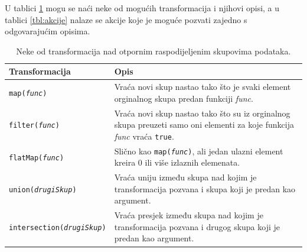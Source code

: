 \documentclass[times, utf8, zavrsni, numeric]{fer}
\begin{document}
U tablici \ref{tbl:transformacije} mogu se naći neke od mogućih transformacija i njihovi opisi, a u tablici \ref{tbl:akcije} nalaze se akcije koje je moguće pozvati zajedno s odgovarajućim opisima.
\begin{table}[htb]
\caption{Neke od transformacija nad otpornim raspodijeljenim skupovima podataka.}
\label{tbl:transformacije}
\centering
\begin{tabular}{lp{8cm}} 
\hline
Transformacija & Opis\\
\hline
\texttt{map(\emph{func})} & Vraća novi skup nastao tako što je svaki element orginalnog  skupa predan funkciji \emph{func}. \\
\texttt{filter(\emph{func})} & Vraća novi skup nastao tako što su iz orginalnog skupa preuzeti samo oni elementi za koje funkcija \emph{func} vraća \texttt{true}. \\
\texttt{flatMap(\emph{func})} & Slično kao \texttt{map(\emph{func})}, ali jedan ulazni element kreira 0 ili više izlaznih elemenata. \\
\texttt{union(\emph{drugiSkup})} & Vraća uniju između skupa nad kojim je transformacija pozvana i skupa koji je predan kao argument. \\
\texttt{intersection(\emph{drugiSkup})} & Vraća presjek između skupa nad kojim je transformacija pozvana i drugog skupa koji je predan kao argument. \\
\hline
\end{tabular}
\end{table}
\end{document}
